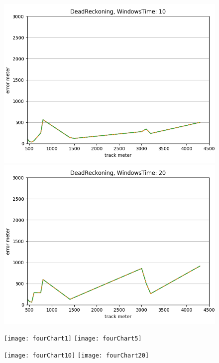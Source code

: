 \documentclass[12pt,a4paper,openright,twoside]{report}
\begin{document}
\begin{figure}[H]
\centering  
\includegraphics[scale=0.4]{thirdChartDeadReckoning-10} 
\includegraphics[scale=0.4]{thirdChartDeadReckoning-20} 
\end{figure}

\begin{figure}[H]
\centering 
\texttt{[image: fourChart1]} 
\texttt{[image: fourChart5]} 
\end{figure}

\begin{figure}[H]
\centering  
\texttt{[image: fourChart10]} 
\texttt{[image: fourChart20]} 
\end{figure}

\newpage
\end{document}

